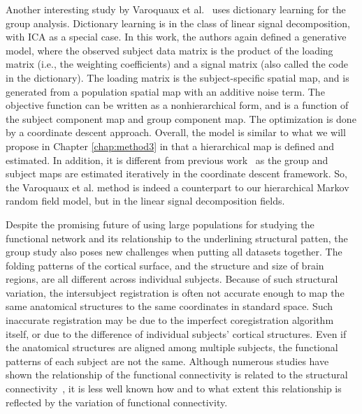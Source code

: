 Another interesting study by Varoquaux et al.~\cite{varoquaux2011multi} uses
dictionary learning for the group analysis. Dictionary learning is in the class
of linear signal decomposition, with ICA as a special case. In this work, the
authors again defined a generative model, where the observed subject data matrix
is the product of the loading matrix (i.e., the weighting coefficients) and a
signal matrix (also called the code in the dictionary). The loading matrix is
the subject-specific spatial map, and is generated from a population spatial map
with an additive noise term. The objective function can be written as a
nonhierarchical form, and is a function of the subject component map and
group component map. The optimization is done by a coordinate descent
approach. Overall, the model is similar to what we will propose in Chapter
\ref{chap:method3} in that a hierarchical map is defined and estimated. In
addition, it is different from previous work~\cite{varoquaux2010group} as the
group and subject maps are estimated iteratively in the coordinate descent
framework. So, the Varoquaux et al. method is indeed a counterpart to our
hierarchical Markov random field model, but in the linear signal decomposition
fields.


Despite the promising future of using large populations for studying the
functional network and its relationship to the underlining structural patten,
the group study also poses new challenges when putting all datasets
together. The folding patterns of the cortical surface, and the structure and
size of brain regions, are all different across individual subjects. Because of
such structural variation, the intersubject registration is often not accurate
enough to map the same anatomical structures to the same coordinates in standard
space. Such inaccurate registration may be due to the imperfect coregistration
algorithm itself, or due to the difference of individual subjects' cortical
structures. Even if the anatomical structures are aligned among multiple subjects,
the functional patterns of each subject are not the same. Although numerous
studies have shown the relationship of the functional connectivity is related to
the structural connectivity~\cite{honey2009predicting,hermundstad2013structural,
  honey2007network}, it is less well known how and to what extent this
relationship is reflected by the variation of functional connectivity.

